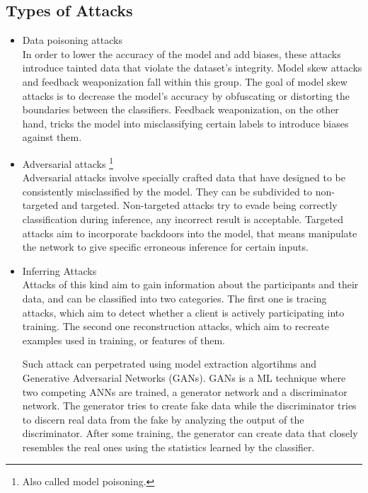 \subsection{Types of Attacks} %

\begin{itemize}
  \item Data poisoning attacks\\
  In order to lower the accuracy of the model and add biases, these attacks introduce tainted data that violate the dataset's integrity. Model skew attacks \cite{Model_skewing_attacks} and feedback weaponization\cite{feedback_weaponization} fall within this group. The goal of model skew attacks is to decrease the model's accuracy by obfuscating or distorting the boundaries between the classifiers. Feedback weaponization, on the other hand, tricks the model into misclassifying certain labels to introduce biases against them.
  
  \item Adversarial attacks \footnote{Also called model poisoning.}\\
  Adversarial attacks \cite{adversarial_attack} involve specially crafted data that have designed to be consistently misclassified by the model. They can be subdivided to non-targeted and targeted. Non-targeted attacks try to evade being correctly classification during inference, any incorrect result is acceptable. Targeted attacks aim to incorporate backdoors into the model, that means manipulate the network to give specific erroneous inference for certain inputs.
  
  \item Inferring Attacks\\
  Attacks of this kind aim to gain information about the participants and their data, and can be classified into two categories. The first one is tracing attacks, which aim to detect whether a client is actively participating into training. The second one reconstruction attacks, which aim to recreate examples used in training, or features of them.
  
  Such attack can perpetrated using model extraction algortihms and Generative Adversarial Networks \cite{GAN_attack} (GANs). GANs is a ML technique where two competing ANNs are trained, a generator network and a discriminator network. The generator tries to create fake data while the discriminator tries to discern real data from the fake by analyzing the output of the discriminator. After some training, the generator can create data that closely resembles the real ones using the statistics learned by the classifier.
  

\end{itemize}
